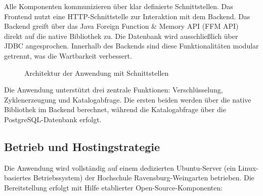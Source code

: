\documentclass[12pt, ngerman, a4paper, numbers=noenddot]{article}
\begin{document}
Alle Komponenten kommunizieren über klar definierte Schnittstellen. Das Frontend nutzt eine HTTP-Schnittstelle zur Interaktion mit dem Backend. Das Backend greift über das Java Foreign Function \& Memory API (FFM API) direkt auf die native Bibliothek zu. Die Datenbank wird ausschließlich über JDBC angesprochen. Innerhalb des Backends sind diese Funktionalitäten modular getrennt, was die Wartbarkeit verbessert.


\begin{figure}[H]
	\centering
	\caption{Architektur der Anwendung mit Schnittstellen}
	\label{fig:architektur-schnittstellen}
\end{figure}


Die Anwendung unterstützt drei zentrale Funktionen: Verschlüsselung, Zyklenerzeugung und Katalogabfrage. 
Die ersten beiden werden über die native Bibliothek im Backend berechnet, während die Katalogabfrage über die PostgreSQL-Datenbank erfolgt.

\subsection{Betrieb und Hostingstrategie}

Die Anwendung wird vollständig auf einem dedizierten Ubuntu-Server (ein Linux-basiertes Betriebssystem) der Hochschule Ravensburg-Weingarten betrieben. Die Bereitstellung erfolgt mit Hilfe etablierter Open-Source-Komponenten:
\end{document}
